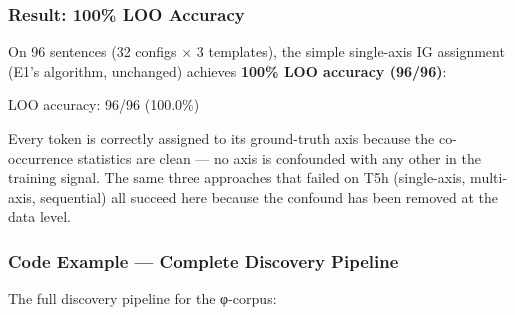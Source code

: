 \documentclass[
  twocolumn,
  10pt,
  a4paper]{article}
\newenvironment{Shaded}{}{}
\newcommand{\DecValTok}[1]{\textcolor[rgb]{0.25,0.63,0.44}{#1}}
\newcommand{\FloatTok}[1]{\textcolor[rgb]{0.25,0.63,0.44}{#1}}
\newcommand{\NormalTok}[1]{#1}
\newcommand{\OperatorTok}[1]{\textcolor[rgb]{0.40,0.40,0.40}{#1}}
\begin{document}
\hypertarget{result-100-loo-accuracy}{%
\subsubsection{Result: 100\% LOO
Accuracy}\label{result-100-loo-accuracy}}

On 96 sentences (32 configs × 3 templates), the simple single-axis IG
assignment (E1's algorithm, unchanged) achieves \textbf{100\% LOO
accuracy (96/96)}:

\begin{Shaded}
\begin{Highlighting}[]
\NormalTok{  LOO accuracy: }\DecValTok{96}\OperatorTok{/}\DecValTok{96}\NormalTok{ (}\FloatTok{100.0}\OperatorTok{\%}\NormalTok{)}
\end{Highlighting}
\end{Shaded}

Every token is correctly assigned to its ground-truth axis because the
co-occurrence statistics are clean --- no axis is confounded with any
other in the training signal. The same three approaches that failed on
T5h (single-axis, multi-axis, sequential) all succeed here because the
confound has been removed at the data level.

\hypertarget{code-example-complete-discovery-pipeline}{%
\subsubsection{Code Example --- Complete Discovery
Pipeline}\label{code-example-complete-discovery-pipeline}}

The full discovery pipeline for the φ-corpus:
\end{document}
